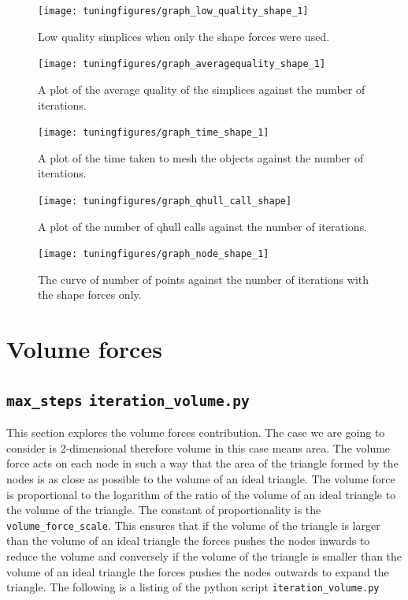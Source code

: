 \documentclass[10pt,a4paper]{book}
\newcommand{\py}[1]{\texttt{\color{blue}#1}}
\begin{document}
\begin{figure}[tbhp]
\centerline{\texttt{[image: tuningfigures/graph\_low\_quality\_shape\_1]}}
\caption{\label{fig:graph_low_quality_shape_1} Low quality simplices when only the shape forces were used.}
\end{figure}

\begin{figure}[tbhp]
\centerline{\texttt{[image: tuningfigures/graph\_averagequality\_shape\_1]}}
\caption{\label{fig:graph_averagequality_shape_1} A plot of the average quality of the simplices against the number of iterations.}
\end{figure}

\begin{figure}[tbhp]
\centerline{\texttt{[image: tuningfigures/graph\_time\_shape\_1]}}
\caption{\label{fig:graph_time_shape_1} A plot of the time taken to mesh the objects against the number of iterations.}
\end{figure}

\begin{figure}[tbhp]
\centerline{\texttt{[image: tuningfigures/graph\_qhull\_call\_shape]}}
\caption{\label{fig:graph_qhull_calls_shape_1} A plot of the number of qhull calls against the number of iterations.}
\end{figure}

\begin{figure}[tbhp]
\centerline{\texttt{[image: tuningfigures/graph\_node\_shape\_1]}}
\caption{\label{fig:graph_node_shape_1} The curve of number of points against the number of iterations with the shape forces only.}
\end{figure}


\clearpage
\section{Volume forces}
\label{sec:volumeforces}

\subsection{\texttt{max\_steps} \py{iteration\_volume.py}}
\label{sec:maxstepsvolume}
This section explores the volume forces contribution. The case we are
going to consider is 2-dimensional therefore volume in this case means
area. The volume force acts on each node in such a way that the area of the
triangle formed by the nodes is as close as possible to the volume of an ideal triangle. The volume force is  proportional to the
logarithm of the ratio of the volume of an ideal triangle to the volume of the
triangle. The constant of proportionality is the
\texttt{volume\_force\_scale}. This ensures that if the volume of the
triangle is larger than the volume of an ideal triangle the forces pushes the nodes inwards to
reduce the volume and conversely if the volume of the triangle is
smaller than the volume of an ideal triangle the forces pushes the nodes outwards to expand the
triangle.
The following is a listing of the python script \py{iteration\_volume.py}
\end{document}
